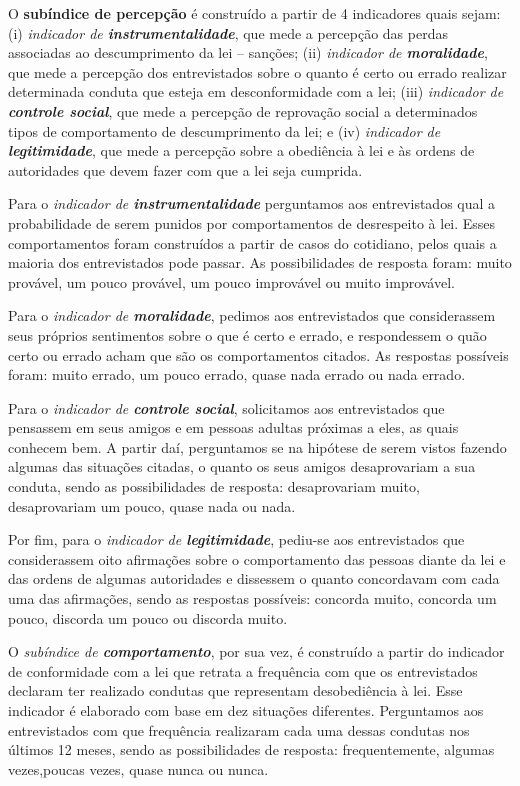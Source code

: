 \documentclass[
	12pt,				%
	openright,			%
	twoside,			%
	a4paper,			%
	chapter=TITLE,		%
	section=TITLE,		%
	subsection=TITLE,	%
	subsubsection=TITLE,%
	spanish,            %
	english,			%
	brazil				%
	]{abntex2}
\begin{document}
\begin{citacao}
O \textbf{subíndice de percepção} é construído a partir de 4 indicadores quais sejam: (i) \textit{indicador de \textbf{instrumentalidade}}, que
mede a percepção das perdas associadas ao descumprimento da lei -- sanções; (ii) \textit{indicador de \textbf{moralidade}}, que mede a
percepção dos entrevistados sobre o quanto é certo ou errado realizar determinada conduta que esteja em desconformidade com a lei; (iii)
\textit{indicador de \textbf{controle social}}, que mede a percepção de reprovação social a determinados tipos de comportamento de
descumprimento da lei; e (iv) \textit{indicador de \textbf{legitimidade}}, que mede a percepção sobre a obediência à lei e às ordens de
autoridades que devem fazer com que a lei seja cumprida.

Para o \textit{indicador de \textbf{instrumentalidade}} perguntamos aos entrevistados qual a probabilidade de serem punidos por comportamentos
de desrespeito à lei. Esses comportamentos foram construídos a partir de casos do cotidiano, pelos quais a maioria dos entrevistados pode
passar. As possibilidades de resposta foram: muito provável, um pouco provável, um pouco improvável ou muito improvável.

Para o \textit{indicador de \textbf{moralidade}}, pedimos aos entrevistados que considerassem seus próprios sentimentos sobre o que é certo e
errado, e respondessem o quão certo ou errado acham que são os comportamentos citados. As respostas possíveis foram: muito errado, um pouco
errado, quase nada errado ou nada errado.

Para o \textit{indicador de \textbf{controle social}}, solicitamos aos entrevistados que pensassem em seus amigos e em pessoas adultas próximas
a eles, as quais conhecem bem. A partir daí, perguntamos se na hipótese de serem vistos fazendo algumas das situações citadas, o quanto os
seus amigos desaprovariam a sua conduta, sendo as possibilidades de resposta: desaprovariam muito, desaprovariam um pouco, quase nada ou nada.

Por fim, para o \textit{indicador de \textbf{legitimidade}}, pediu-se aos entrevistados que considerassem oito afirmações sobre o
comportamento das pessoas diante da lei e das ordens de algumas autoridades e dissessem o quanto concordavam com cada uma das afirmações,
sendo as respostas possíveis: concorda muito, concorda um pouco, discorda um pouco ou discorda muito.

O \textit{subíndice de \textbf{comportamento}}, por sua vez, é construído a partir do indicador de conformidade com a lei que retrata a
frequência com que os entrevistados declaram ter realizado condutas que representam desobediência à lei. Esse indicador é elaborado com base
em dez situações diferentes. Perguntamos aos entrevistados com que frequência realizaram cada uma dessas condutas nos últimos 12 meses, sendo
as possibilidades de resposta: frequentemente, algumas vezes,poucas vezes, quase nunca ou nunca.


\end{citacao}
\end{document}
